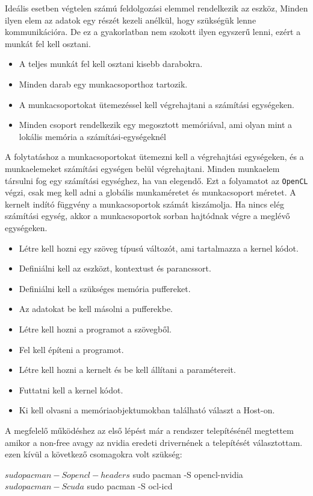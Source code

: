 
Ideális esetben végtelen számú feldolgozási elemmel rendelkezik az eszköz, Minden ilyen elem az adatok egy részét kezeli anélkül, hogy szükségük lenne kommunikációra. De ez a gyakorlatban nem szokott ilyen egyszerű lenni, ezért a munkát fel kell osztani.
\begin{itemize}
\item A teljes munkát fel kell osztani kisebb darabokra.
\item Minden darab egy munkacsoporthoz tartozik.
\item A munkacsoportokat ütemezéssel kell végrehajtani a számítási egységeken.
\item Minden csoport rendelkezik egy megosztott memóriával, ami olyan mint a lokális memória a számítási-egységeknél
\end{itemize}
A folytatáshoz a munkacsoportokat ütemezni kell a végrehajtási egységeken, és a munkaelemeket számítási egységen belül végrehajtani.
Minden munkaelem társulni fog egy számítási egységhez, ha van elegendő. Ezt a folyamatot az \texttt{OpenCL} végzi, csak meg kell adni a globális munkaméretet és munkacsoport méretet. A kernelt indító függvény a  munkacsoportok számát kiszámolja. Ha nincs elég számítási egység, akkor a munkacsoportok sorban hajtódnak végre a meglévő egységeken.

\begin{itemize}
\item Létre kell hozni egy szöveg típusú változót, ami tartalmazza a kernel kódot.
\item Definiálni kell az eszközt, kontextust és parancssort.
\item Definiálni kell a szükséges memória puffereket.
\item Az adatokat be kell másolni a pufferekbe.
\item Létre kell hozni a programot a szövegből.
\item Fel kell építeni a programot.
\item Létre kell hozni a kernelt és be kell állítani a paramétereit.
\item Futtatni kell a kernel kódot.
\item Ki kell olvasni a memóriaobjektumokban található választ a Host-on.
\end{itemize}


A megfelelő működéshez az első lépést már a rendszer telepítésénél megtettem amikor a non-free avagy az nvidia eredeti drivernének a telepítését választottam.
ezen kívül a következő csomagokra volt szükség: 

\begin{python}
$ sudo pacman -S opencl-headers
$ sudo pacman -S opencl-nvidia
$ sudo pacman -S cuda
$ sudo pacman -S ocl-icd
\end{python}
